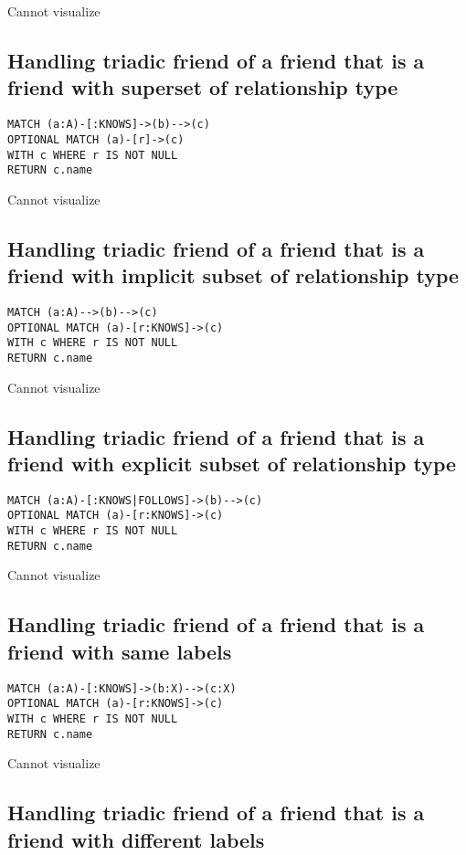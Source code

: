 Cannot visualize
\subsection{Handling triadic friend of a friend that is a friend with superset of relationship type}

\begin{lstlisting}
MATCH (a:A)-[:KNOWS]->(b)-->(c)
OPTIONAL MATCH (a)-[r]->(c)
WITH c WHERE r IS NOT NULL
RETURN c.name
\end{lstlisting}

Cannot visualize
\subsection{Handling triadic friend of a friend that is a friend with implicit subset of relationship type}

\begin{lstlisting}
MATCH (a:A)-->(b)-->(c)
OPTIONAL MATCH (a)-[r:KNOWS]->(c)
WITH c WHERE r IS NOT NULL
RETURN c.name
\end{lstlisting}

Cannot visualize
\subsection{Handling triadic friend of a friend that is a friend with explicit subset of relationship type}

\begin{lstlisting}
MATCH (a:A)-[:KNOWS|FOLLOWS]->(b)-->(c)
OPTIONAL MATCH (a)-[r:KNOWS]->(c)
WITH c WHERE r IS NOT NULL
RETURN c.name
\end{lstlisting}

Cannot visualize
\subsection{Handling triadic friend of a friend that is a friend with same labels}

\begin{lstlisting}
MATCH (a:A)-[:KNOWS]->(b:X)-->(c:X)
OPTIONAL MATCH (a)-[r:KNOWS]->(c)
WITH c WHERE r IS NOT NULL
RETURN c.name
\end{lstlisting}

Cannot visualize
\subsection{Handling triadic friend of a friend that is a friend with different labels}

